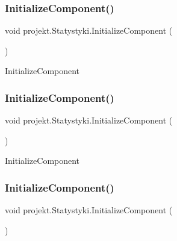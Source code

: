 \subsubsection{\texorpdfstring{Initialize\+Component()}{InitializeComponent()}\hspace{0.1cm}{\footnotesize\ttfamily [1/9]}}
{\footnotesize\ttfamily void projekt.\+Statystyki.\+Initialize\+Component (\begin{DoxyParamCaption}{ }\end{DoxyParamCaption})\hspace{0.3cm}{\ttfamily [inline]}}



Initialize\+Component 

\mbox{\label{classprojekt_1_1_statystyki_a6f4801d8176e1c715f5260bf055b0915}} 
\subsubsection{\texorpdfstring{Initialize\+Component()}{InitializeComponent()}\hspace{0.1cm}{\footnotesize\ttfamily [2/9]}}
{\footnotesize\ttfamily void projekt.\+Statystyki.\+Initialize\+Component (\begin{DoxyParamCaption}{ }\end{DoxyParamCaption})\hspace{0.3cm}{\ttfamily [inline]}}



Initialize\+Component 

\mbox{\label{classprojekt_1_1_statystyki_a6f4801d8176e1c715f5260bf055b0915}} 
\subsubsection{\texorpdfstring{Initialize\+Component()}{InitializeComponent()}\hspace{0.1cm}{\footnotesize\ttfamily [3/9]}}
{\footnotesize\ttfamily void projekt.\+Statystyki.\+Initialize\+Component (\begin{DoxyParamCaption}{ }\end{DoxyParamCaption})\hspace{0.3cm}{\ttfamily [inline]}}



